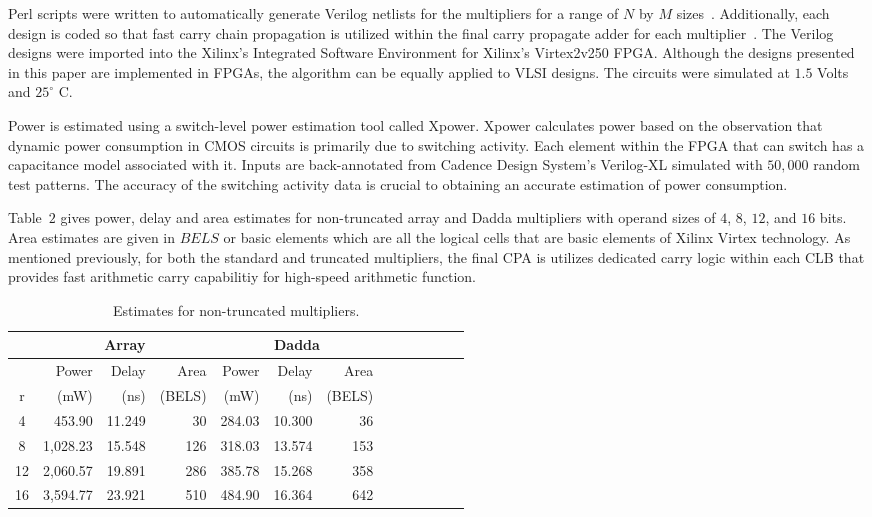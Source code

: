 Perl scripts were written to automatically generate Verilog
netlists for the multipliers for a range of $N$ by $M$ sizes~\cite{duverne}. 
Additionally, each design is coded so that fast carry chain propagation is utilized within
the final carry propagate adder for each multiplier~\cite{xilinx}.
The Verilog designs were imported into
the Xilinx's Integrated Software Environment for Xilinx's Virtex2v250
FPGA.  Although the designs presented
in this paper are implemented in FPGAs, the algorithm can be equally applied
to VLSI designs.  
The circuits
were simulated at $1.5$ Volts and $25^{\circ}$ C. 

Power is estimated 
using a switch-level power estimation tool called Xpower.  
Xpower calculates power based on the observation that dynamic power
consumption
in CMOS circuits is primarily due to switching activity.  Each element within
the FPGA that can switch has a capacitance model associated with it.  Inputs are
back-annotated from Cadence Design System's Verilog-XL simulated with
$50,000$ random test patterns.  The accuracy of the switching activity data
is crucial to obtaining an accurate estimation of power consumption.

Table~$2$ gives power, delay and area estimates 
for non-truncated array and Dadda multipliers with operand sizes of 
$4$, $8$, $12$, and $16$ bits. 
Area estimates are given in $BELS$ or basic elements which are all
the logical cells that are basic elements of Xilinx Virtex technology.
As mentioned previously, for both the standard and
truncated multipliers, the final CPA is 
utilizes dedicated carry logic
within each CLB that provides fast arithmetic carry capabilitiy for
high-speed
arithmetic function.  
\begin{table*}
\centering
\label{mult1.tbl}
\begin{tabular}{|c|r|r|r||r|r|r||r|r|r||r|r|r||} \hline
\multicolumn{1}{|c|}{} & \multicolumn{3}{|c||}{Array} &
\multicolumn{3}{|c||}{Dadda} \\ \hline
   & Power & Delay & Area & Power & Delay & Area \\ 
r  & (mW)  & (ns)  & (BELS) & (mW) & (ns) & (BELS)   \\ \hline \hline
4  &  453.90  & 11.249 &  30 & 284.03 & 10.300 &  36 \\ \hline 
8  & 1,028.23 & 15.548 & 126 & 318.03 & 13.574 & 153 \\ \hline 
12 & 2,060.57 & 19.891 & 286 & 385.78 & 15.268 & 358 \\ \hline 
16 & 3,594.77 & 23.921 & 510 & 484.90 & 16.364 & 642 \\ \hline 
\end{tabular}
\caption{Estimates for non-truncated multipliers.}
\end{table*}

